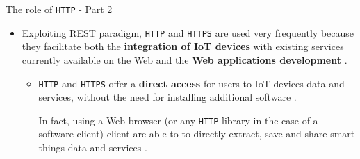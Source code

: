 \documentclass[10pt]{beamer}
\begin{document}
\begin{frame}{The role of \texttt{HTTP} - Part 2}

\begin{itemize}
\justifying
\item Exploiting REST paradigm, \texttt{HTTP} and \texttt{HTTPS} are used very frequently because they facilitate both the \textbf{integration of IoT devices} with existing services currently available on the Web and the \textbf{Web applications development} \cite{IOTCITY}\cite{WOT}.

\begin{itemize}
\item \texttt{HTTP} and \texttt{HTTPS} offer a \textbf{direct access} for users to IoT devices data and services, without the need for installing additional software \cite{IOTCITY}.

In fact, using a Web browser (or any \texttt{HTTP} library in the case of a software client) client are able to to directly extract, save and share smart things data and services \cite{WOT}.
\end{itemize}
\end{itemize}

\end{frame} 
\end{document}
